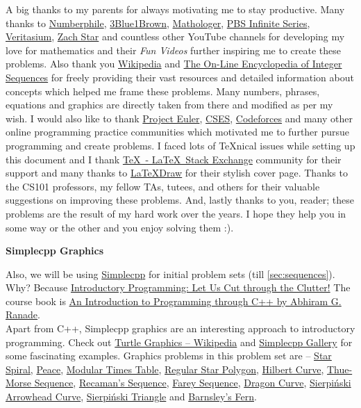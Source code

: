 \documentclass[../Problems]{subfiles}
\begin{document}
A big thanks to my parents for always motivating me to stay productive. Many thanks to \href{https://www.youtube.com/@numberphile}{Numberphile}, \href{https://www.youtube.com/@3blue1brown}{3Blue1Brown}, \href{https://www.youtube.com/@Mathologer}{Mathologer}, \href{https://www.youtube.com/@pbsinfiniteseries}{PBS Infinite Series}, \href{https://www.youtube.com/@veritasium}{Veritasium}, \href{https://www.youtube.com/@zachstar}{Zach Star} and countless other YouTube channels for developing my love for mathematics and their \emph{Fun Videos} further inspiring me to create these problems. Also thank you \href{https://en.wikipedia.org/wiki/Main_Page}{Wikipedia} and \href{http://oeis.org/}{The On-Line Encyclopedia of Integer Sequences} for freely providing their vast resources and detailed information about concepts which helped me frame these problems. Many numbers, phrases, equations and graphics are directly taken from there and modified as per my wish. I would also like to thank \href{https://projecteuler.net/}{Project Euler}, \href{https://cses.fi/problemset}{CSES}, \href{https://codeforces.com/}{Codeforces} and many other online programming practice communities which motivated me to further pursue programming and create problems. I faced lots of \TeX nical issues while setting up this document and I thank \href{tex.stackexchange.com}{\TeX\ - \LaTeX\ Stack Exchange} community for their support and many thanks to \href{https://latexdraw.com/tikz-cover-pages-gallery/}{\LaTeX Draw} for their stylish cover page. Thanks to the CS101 professors, my fellow TAs, tutees, and others for their valuable suggestions on improving these problems. And, lastly thanks to you, reader; these problems are the result of my hard work over the years. I hope they help you in some way or the other and you enjoy solving them :).
\begin{center}
	\textbf{\Large{Simplecpp Graphics}}
\end{center}
Also, we will be using \href{https://www.cse.iitb.ac.in/~ranade/simplecpp/}{Simplecpp} for initial problem sets (till \ref{sec:sequences}).
Why? Because \href{https://www.cse.iitb.ac.in/~ranade/iticse16.pdf}{Introductory Programming: Let Us Cut through the Clutter!} The course book is \href{https://www.cse.iitb.ac.in/~ranade/book.html}{An Introduction to Programming through C++ by Abhiram G. Ranade}.\\
Apart from C++, Simplecpp graphics are an interesting approach to introductory programming. Check out \href{https://en.wikipedia.org/wiki/Turtle_graphics}{Turtle Graphics -- Wikipedia} and \href{https://www.cse.iitb.ac.in/~ranade/simplecpp/gallery.html}{Simplecpp Gallery} for some fascinating examples. Graphics problems in this problem set are -- \hyperref[pp:starspiral]{Star Spiral}, \hyperref[pp:peace]{Peace}, \hyperref[pp:timestable]{Modular Times Table}, \hyperref[pp:regularstarpolygon]{Regular Star Polygon}, \hyperref[pp:hilbertcurve]{Hilbert Curve}, \hyperref[pp:thuemorsesequence]{Thue-Morse Sequence}, \hyperref[pp:recamanssequence]{Recaman's Sequence}, \hyperref[pp:fareysequence]{Farey Sequence}, \hyperref[pp:dragoncurve]{Dragon Curve}, \hyperref[pp:sierpinskicurve]{Sierpi\'nski Arrowhead Curve}, \hyperref[pp:sierpinskitriangle]{Sierpi\'nski Triangle} and \hyperref[pp:barnsleyfern]{Barnsley's Fern}. %
\end{document}
